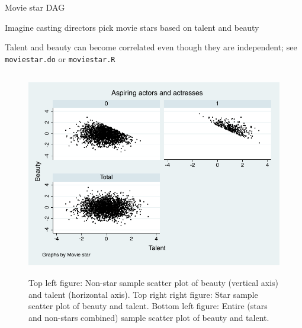 \documentclass{beamer}
\begin{document}
\begin{frame}{Movie star DAG}

Imagine casting directors pick movie stars based on talent and beauty

  \begin{center}
  \end{center}

Talent and beauty can become correlated even though they are independent; see \texttt{moviestar.do} or \texttt{moviestar.R}


\end{frame}

\begin{frame}[shrink=20,plain]

  \begin{figure}
    \includegraphics[height=9cm]{./lecture_includes/beauty_collider.pdf}
    \caption{Top left figure: Non-star sample scatter plot of beauty (vertical axis) and talent (horizontal axis). Top right right figure: Star sample scatter plot of beauty and talent.  Bottom left figure: Entire (stars and non-stars combined) sample scatter plot of beauty and talent.}
  \end{figure}
\end{frame}
\end{document}
